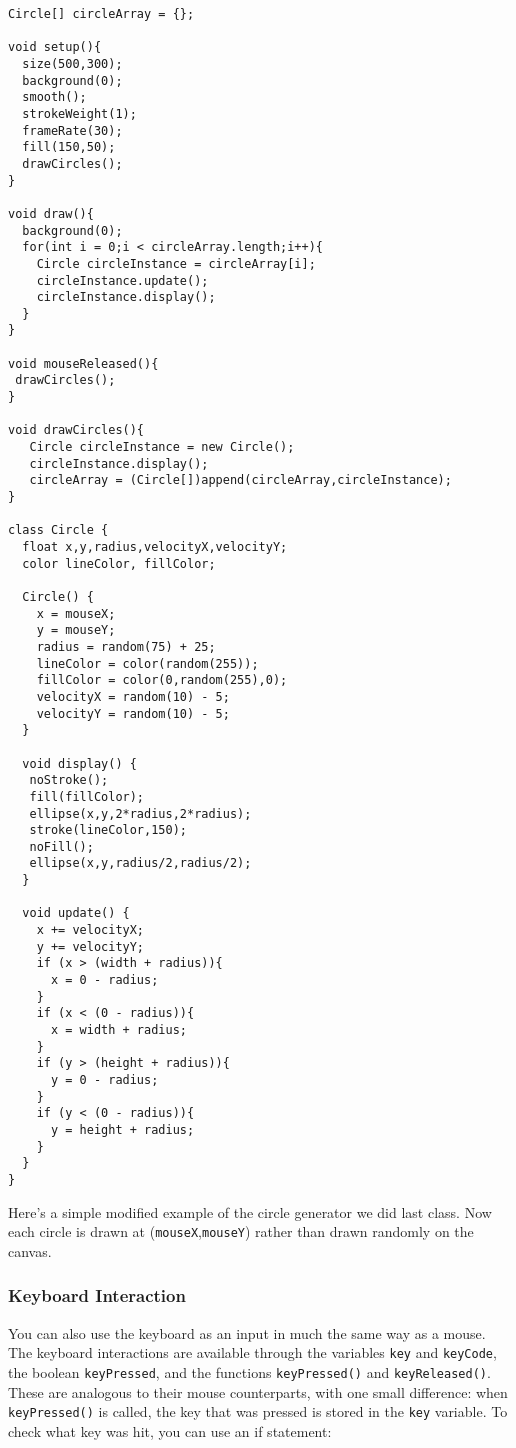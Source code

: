 \begin{verbatim}
Circle[] circleArray = {};

void setup(){
  size(500,300);
  background(0);
  smooth();
  strokeWeight(1);
  frameRate(30);
  fill(150,50);
  drawCircles();
}

void draw(){
  background(0);
  for(int i = 0;i < circleArray.length;i++){
    Circle circleInstance = circleArray[i];
    circleInstance.update();
    circleInstance.display();
  }
}

void mouseReleased(){
 drawCircles(); 
}

void drawCircles(){
   Circle circleInstance = new Circle();
   circleInstance.display();
   circleArray = (Circle[])append(circleArray,circleInstance);
}

class Circle {
  float x,y,radius,velocityX,velocityY;
  color lineColor, fillColor;
  
  Circle() {
    x = mouseX;
    y = mouseY;
    radius = random(75) + 25;
    lineColor = color(random(255));
    fillColor = color(0,random(255),0);
    velocityX = random(10) - 5;
    velocityY = random(10) - 5;
  }
  
  void display() {
   noStroke();
   fill(fillColor);
   ellipse(x,y,2*radius,2*radius);
   stroke(lineColor,150);
   noFill();
   ellipse(x,y,radius/2,radius/2); 
  }  
  
  void update() {
    x += velocityX;
    y += velocityY;
    if (x > (width + radius)){
      x = 0 - radius;
    }
    if (x < (0 - radius)){
      x = width + radius;
    }
    if (y > (height + radius)){
      y = 0 - radius;
    }
    if (y < (0 - radius)){
      y = height + radius;
    }
  }
}
\end{verbatim}

Here's a simple modified example of the circle generator we did last class.  Now each circle is drawn at (\texttt{mouseX},\texttt{mouseY}) rather than drawn randomly on the canvas.

\subsubsection{Keyboard Interaction}
You can also use the keyboard as an input in much the same way as a mouse.  The keyboard interactions are available through the variables \texttt{key} and \texttt{keyCode}, the boolean \texttt{keyPressed}, and the functions \texttt{keyPressed()} and \texttt{keyReleased()}.  These are analogous to their mouse counterparts, with one small difference:  when \texttt{keyPressed()} is called, the key that was pressed is stored in the \texttt{key} variable.  To check what key was hit, you can use an if statement:

